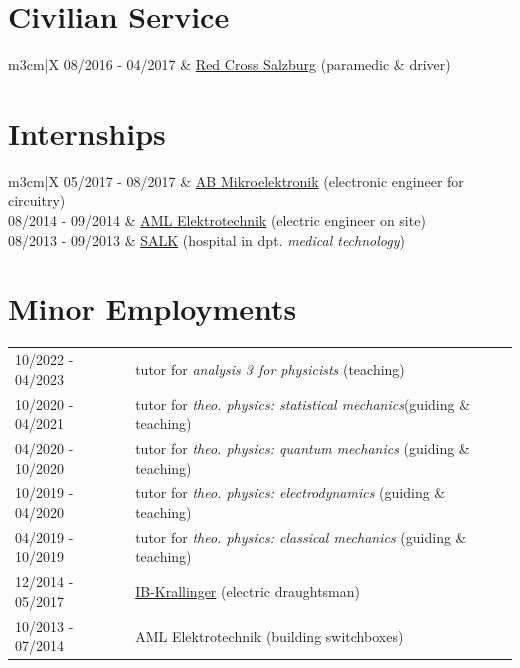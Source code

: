 \documentclass[english,10pt]{article}
\begin{document}
	\section*{Civilian Service}
	\begin{tabularx}{\linewidth}{m{3cm}|X}
		08/2016 - 04/2017 & \href{https://www.roteskreuz.at/salzburg/ich-will-helfen/zivildienst}{Red Cross Salzburg} \hfill  (paramedic \& driver)
	\end{tabularx}
	
	\section*{Internships}
	\begin{tabularx}{\linewidth}{m{3cm}|X}
		05/2017 - 08/2017 & \href{https://www.die-salzburger-industrie.at/unternehmen/a-b-mikroelektronik-gmbh/}{AB Mikroelektronik} \hfill (electronic engineer for circuitry)\\
		08/2014 - 09/2014 & \href{https://www.northdata.com/AML+Elektrotechnik+GmbH,+Koppl/360865i}{AML Elektrotechnik} \hfill (electric engineer on site)\\
		08/2013 - 09/2013 & \href{https://salk.at/}{SALK} \hfill (hospital in dpt. \textit{medical technology})
	\end{tabularx}
	
	\section*{Minor Employments}
	\begin{tabularx}{\linewidth}{m{3cm}|X}
		10/2022 - 04/2023 & tutor for \textit{analysis 3 for physicists} \hfill(teaching)\\
		10/2020 - 04/2021 & tutor for \textit{theo. physics: statistical mechanics}\hfill (guiding \& teaching)\\
		04/2020 - 10/2020 & tutor for \textit{theo. physics: quantum mechanics} \hfill (guiding \& teaching)\\
		10/2019 - 04/2020 & tutor for \textit{theo. physics: electrodynamics} \hfill (guiding \& teaching)\\
		04/2019 - 10/2019 & tutor for \textit{theo. physics: classical mechanics} \hfill (guiding \& teaching)\\
		12/2014 - 05/2017 & \href{https://www.ib-krallinger.com/}{IB-Krallinger} \hfill (electric draughtsman)\\
		10/2013 - 07/2014 & AML Elektrotechnik \hfill (building switchboxes)
	\end{tabularx}
	
\end{document}
